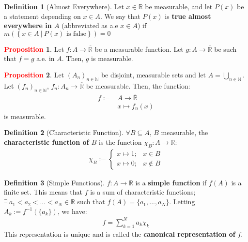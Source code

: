 \documentclass[reqno,11pt]{amsart}
\theoremstyle{definition}
\newtheorem{question}{Question}
\newcommand{\bb}[1]{\mathbb{#1}}
\newcommand{\sets}[2]{ \left\{ #1\ |\ #2 \right\}}
\theoremstyle{definition}
\newtheorem{definition}{\textcolor{OliveGreen}{Definition}}
\newtheorem{prop}{\textcolor{red}{Proposition}}
\theoremstyle{remark}
\begin{document}
\begin{definition}[Almost Everywhere]
	Let $x \in \bb{R}$ be measurable, and let $P(x)$ be a statement depending on $x \in A$. We say that $P(x)$ is \textbf{true almost everywhere in $A$} (abbreviated as a.e $x \in A$) if $m(\sets{x \in A}{P(x) \mbox{ is false} })=0$
\end{definition}


\begin{prop}
	Let $f: A \rightarrow \overline{\bb{R}}$ be a measurable function. Let $g: A \rightarrow \overline{\bb{R}}$ be such that $f = g$ a.e. in $A$. Then, $g$ is measurable. 
\end{prop}

\begin{prop}
	Let $(A_n)_{n \in \bb{N}}$ be disjoint, measurable sets and let $A = \bigcup_{n \in \bb{N}}$. Let $(f_n)_{n \in \bb{N}}$, $f_n: A_n \rightarrow \overline{\bb{R}}$ be measurable. Then, the function: 
	\begin{align*}
		f:= & A \rightarrow \overline{ \bb{R}	} \\
		& x \mapsto f_n(x) 
	\end{align*}
	is measurable. 
\end{prop}

\begin{definition}[Characteristic Function]
	$\forall B \subseteq A$, $B$ measurable, the \textbf{characteristic function of $B$} is the function $\chi_B: A \rightarrow \bb{R}$: 
	\begin{align}
		\chi_B := \begin{cases}
			x \mapsto 1; & x \in B \\
			x \mapsto 0; & x \notin B 
		\end{cases}
	\end{align}
\end{definition}

\begin{definition}[Simple Functions]
	$f: A \rightarrow \bb{R}$ is a \textbf{simple function} if $f(A)$ is a finite set. This means that $f$ is a sum of characteristic functions; $\exists\ a_1 < a_2 < ... < a_N \in \bb{R}$ such that $f(A) = \{ a_1, ..., a_N \}$. Letting $A_k := f^{-1}(\{ a_k \})$, we have: 
	\begin{align*}
		f = \sum_{k=1}^N a_k \chi_k	
	\end{align*}
	This representation is unique and is called the \textbf{canonical representation of} $f$. 
\end{definition}
\end{document}
